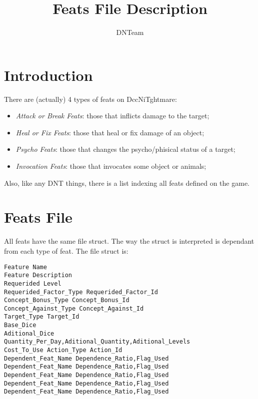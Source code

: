 \documentclass[letterpaper,12pt]{article}
\begin{document}
\title{Feats File Description}

\author{
DNTeam
}

\maketitle



\section{Introduction}

There are (actually) 4 types of feats on DccNiTghtmare:

\begin{itemize}
\item{{\it Attack or Break Feats}: those that inflicts damage to the target;}
\item{{\it Heal or Fix Feats}: those that heal or fix damage of an object;}
\item{{\it Psycho Feats}: those that changes the psycho/phisical status of a
target;} 
\item{{\it Invocation Feats}: those that invocates some object or animals;}
\end{itemize}

Also, like any DNT things, there is a list indexing all feats defined
on the game.

\section{Feats File}

All feats have the same file struct. The way the struct is interpreted is
dependant from each type of feat. The file struct is:

\begin{verbatim}
Feature Name
Feature Description
Requerided Level
Requerided_Factor_Type Requerided_Factor_Id
Concept_Bonus_Type Concept_Bonus_Id
Concept_Against_Type Concept_Against_Id
Target_Type Target_Id
Base_Dice
Aditional_Dice
Quantity_Per_Day,Aditional_Quantity,Aditional_Levels
Cost_To_Use Action_Type Action_Id
Dependent_Feat_Name Dependence_Ratio,Flag_Used
Dependent_Feat_Name Dependence_Ratio,Flag_Used
Dependent_Feat_Name Dependence_Ratio,Flag_Used
Dependent_Feat_Name Dependence_Ratio,Flag_Used
Dependent_Feat_Name Dependence_Ratio,Flag_Used
\end{verbatim}
\end{document}
